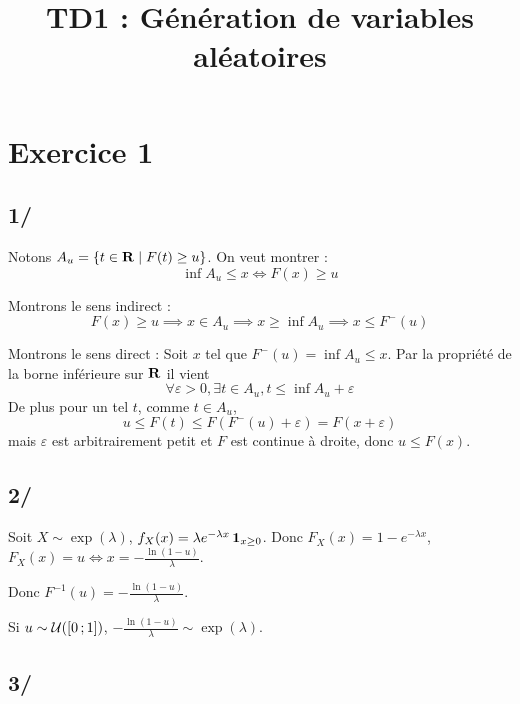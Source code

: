 \documentclass[a4paper,9pt]{article}
\title{\vspace{-1.2cm} \textbf{TD1 : Génération de variables aléatoires}}
\begin{document}
\maketitle

\vspace{-1.5cm}

\section*{Exercice 1}

	\subsection{1/}
	
		Notons $A_u = \{ t \in \mathbf{R} \mid F(t) \geq u \}$.
		On veut montrer :
		$$\inf A_u \leq x
		\iff F(x) \geq u$$
		
		Montrons le sens indirect :
		$$F(x) \geq u \implies x \in A_u \implies x \geq \inf A_u \implies x \leq F^-(u)$$
		
		Montrons le sens direct :
		Soit $x$ tel que $F^-(u) = \inf A_u \leq x$.
		Par la propriété de la borne inférieure sur $\mathbf{R}$ il vient
		$$\forall \varepsilon > 0, \exists t \in A_u, t \leq \inf A_u + \varepsilon$$
		De plus pour un tel $t$, comme $t \in A_u$,
		$$u \leq F(t) \leq F( F^-(u) + \varepsilon) = F(x + \varepsilon)$$
		mais $\varepsilon$ est arbitrairement petit et $F$ est continue à droite, donc $u \leq F(x)$.
		
	\subsection{2/}
	
		Soit $X \sim \exp(\lambda)$, $f_X(x) = \lambda e^{-\lambda x} \operatorname{\mathbf{1}}_{x \geq 0}$.
		Donc $F_X(x) = 1 - e^{-\lambda x}$, $F_X(x) = u \iff x = - \frac{\ln(1 - u)}{\lambda}$.
		
		Donc $F^{-1}(u) = - \frac{\ln(1 - u)}{\lambda}$.
		
		Si $u \sim \mathcal{U}(\mathopen{[}0\mathclose{}\mathpunct{};1\mathclose{]})$, $- \frac{\ln(1 - u)}{\lambda} \sim \exp(\lambda)$.

	\subsection{3/}
	
		
\end{document}

